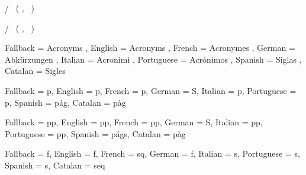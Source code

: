 \let\l@acro\l@figure
  
  {
    \acroheading
    \acropreamble
    \acronopagerange
    \acroneedpages
    \acronymsmapF
      {
          {
            \numberline
              {   { / }  }
              {
                 {~(}
                 {,~}
                 {)}
              }
          }
          { \acropages {} {} }
          {}
      }
      { \AcroRerun }
  }

  {
    \acroheading
    \acropreamble
    \acronopagerange
    \acroneedpages
    \acronymsmapF
      {
          {   { / }  }
          {}{}
          {
             {~(}
             {,~}
             {)}
          }
          { \acropages {} {} }
          {}
      }
      { \AcroRerun }
  }

  {
    Fallback   = Acronyms ,
    English    = Acronyms ,
    French     = Acronymes ,
    German     = Abk\"urzungen ,
    Italian    = Acronimi ,
    Portuguese = Acr\'onimos ,
    Spanish    = Siglas ,
    Catalan    = Sigles
  }

  {
    Fallback   = p\abbrdot ,
    English    = p\abbrdot ,
    French     = p\abbrdot ,
    German     = S\abbrdot ,
    Italian    = p\abbrdot ,
    Portuguese = p\abbrdot ,
    Spanish    = p\'ag\abbrdot ,
    Catalan    = p\`ag\abbrdot
  }

  {
    Fallback   = pp\abbrdot ,
    English    = pp\abbrdot ,
    French     = pp\abbrdot ,
    German     = S\abbrdot ,
    Italian    = pp\abbrdot ,
    Portuguese = pp\abbrdot ,
    Spanish    = p\'ags\abbrdot ,
    Catalan    = p\`ag\abbrdot
  }

  {
    Fallback   = f\abbrdot ,
    English    = f\abbrdot ,
    French     = sq\abbrdot ,
    German     = f\abbrdot ,
    Italian    = s\abbrdot ,
    Portuguese = s\abbrdot ,
    Spanish    = s\abbrdot ,
    Catalan    = seq\abbrdot
  }

